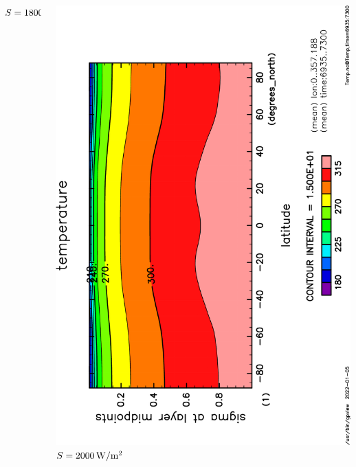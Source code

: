 \documentclass[aspectratio=149,9pt,fleqn]{beamer}
\begin{document}
\begin{frame}
\begin{columns}[T]
\begin{column}{.3\textwidth}
			\(S=1800\hmu{W/m^2}\)
		\end{column}
		\begin{column}{.3\textwidth}
			\centering
			\includegraphics[height=\textwidth,angle=-90]{S2000/Temp,time=6935:7300-crop.pdf}
			\(S=2000\hmu{W/m^2}\)
		\end{column}
	\end{columns}
\end{frame}
\end{document}
